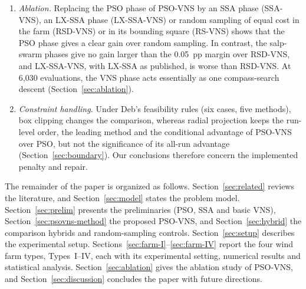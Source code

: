 \begin{enumerate}
\item \emph{Ablation.} Replacing the PSO phase of PSO-VNS by an SSA phase (SSA-VNS), an LX-SSA phase (LX-SSA-VNS) or random sampling of equal cost in the farm (RSD-VNS) or in its bounding square (RS-VNS) shows that the PSO phase gives a clear gain over random sampling. In contrast, the salp-swarm phases give no gain larger than the 0.05~pp margin over RSD-VNS, and LX-SSA-VNS, with LX-SSA as published, is worse than RSD-VNS. At 6,030 evaluations, the VNS phase acts essentially as one compass-search descent (Section~\ref{sec:ablation}).
\item \emph{Constraint handling.} Under Deb's feasibility rules (six cases, five methods), box clipping changes the comparison, whereas radial projection keeps the run-level order, the leading method and the conditional advantage of PSO-VNS over PSO, but not the significance of its all-run advantage (Section~\ref{sec:boundary}). Our conclusions therefore concern the implemented penalty and repair.
\end{enumerate}

The remainder of the paper is organized as follows. Section~\ref{sec:related} reviews the literature, and Section~\ref{sec:model} states the problem model. Section~\ref{sec:prelim} presents the preliminaries (PSO, SSA and basic VNS), Section~\ref{sec:psovns-method} the proposed PSO-VNS, and Section~\ref{sec:hybrid} the comparison hybrids and random-sampling controls. Section~\ref{sec:setup} describes the experimental setup. Sections~\ref{sec:farm-I}--\ref{sec:farm-IV} report the four wind farm types, Types~I--IV, each with its experimental setting, numerical results and statistical analysis. Section~\ref{sec:ablation} gives the ablation study of PSO-VNS, and Section~\ref{sec:discussion} concludes the paper with future directions.
